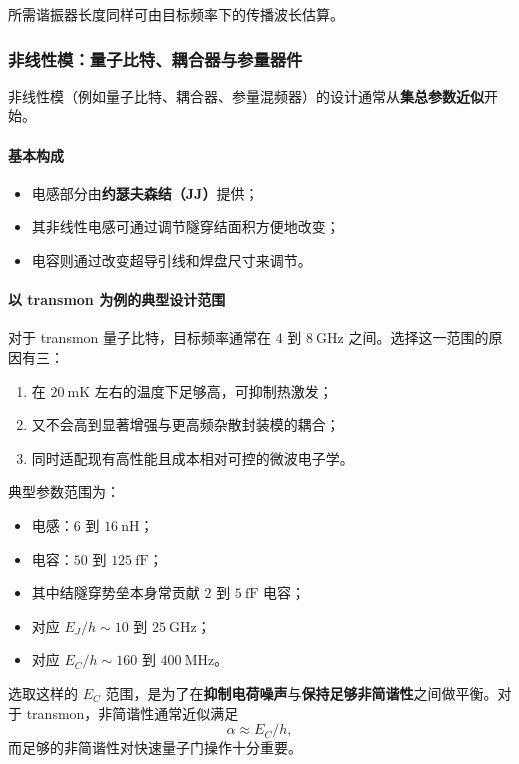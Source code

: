 \documentclass[12pt,a4paper,oneside]{ctexbook}
\begin{document}
所需谐振器长度同样可由目标频率下的传播波长估算。

\subsubsection{非线性模：量子比特、耦合器与参量器件}

非线性模（例如量子比特、耦合器、参量混频器）的设计通常从\textbf{集总参数近似}开始。

\paragraph{基本构成}
\begin{itemize}
    \item 电感部分由\textbf{约瑟夫森结（JJ）}提供；
    \item 其非线性电感可通过调节隧穿结面积方便地改变；
    \item 电容则通过改变超导引线和焊盘尺寸来调节。
\end{itemize}

\paragraph{以 transmon 为例的典型设计范围}
对于 transmon 量子比特，目标频率通常在 \(4\) 到 \(8~\mathrm{GHz}\) 之间。选择这一范围的原因有三：
\begin{enumerate}
    \item 在 \(20~\mathrm{mK}\) 左右的温度下足够高，可抑制热激发；
    \item 又不会高到显著增强与更高频杂散封装模的耦合；
    \item 同时适配现有高性能且成本相对可控的微波电子学。
\end{enumerate}

典型参数范围为：
\begin{itemize}
    \item 电感：\(6\) 到 \(16~\mathrm{nH}\)；
    \item 电容：\(50\) 到 \(125~\mathrm{fF}\)；
    \item 其中结隧穿势垒本身常贡献 \(2\) 到 \(5~\mathrm{fF}\) 电容；
    \item 对应 \(E_J/h \sim 10\) 到 \(25~\mathrm{GHz}\)；
    \item 对应 \(E_C/h \sim 160\) 到 \(400~\mathrm{MHz}\)。
\end{itemize}

选取这样的 \(E_C\) 范围，是为了在\textbf{抑制电荷噪声}与\textbf{保持足够非简谐性}之间做平衡。对于 transmon，非简谐性通常近似满足
\[
\alpha \approx E_C/h,
\]
而足够的非简谐性对快速量子门操作十分重要。
\end{document}

